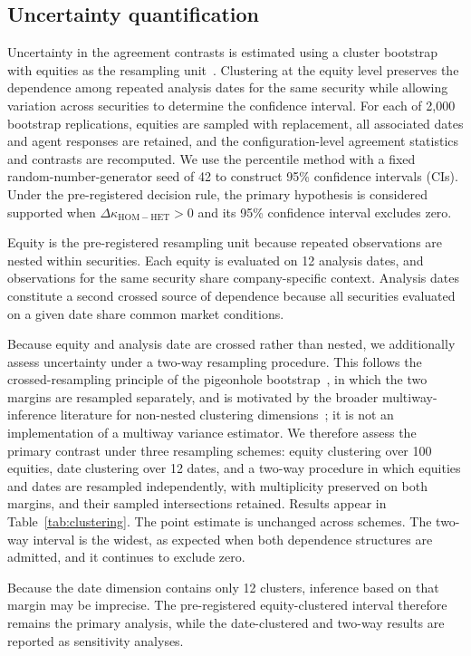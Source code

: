 \documentclass{ieeeaccess}
\begin{document}
\subsection{Uncertainty quantification}
\label{subsec:uncertainty}
Uncertainty in the agreement contrasts is estimated using a cluster bootstrap
with equities as the resampling unit~\cite{efron1993}. Clustering at the equity
level preserves the dependence among repeated analysis dates for the same
security while allowing variation across securities to determine the confidence
interval. For each of 2{,}000 bootstrap replications, equities are sampled with
replacement, all associated dates and agent responses are retained, and the
configuration-level agreement statistics and contrasts are recomputed. We use
the percentile method with a fixed random-number-generator seed of 42 to
construct 95\% confidence intervals (CIs). Under the pre-registered decision
rule, the
primary hypothesis is considered supported when
$\Delta\kappa_{\mathrm{HOM-HET}}>0$ and its 95\% confidence interval excludes
zero.

Equity is the pre-registered resampling unit because repeated observations are
nested within securities. Each equity is evaluated on 12 analysis dates, and
observations for the same security share company-specific context. Analysis dates
constitute a second crossed source of dependence because all securities evaluated
on a given date share common market conditions.

Because equity and analysis date are crossed rather than nested, we additionally
assess uncertainty under a two-way resampling procedure. This follows the
crossed-resampling principle of the pigeonhole
bootstrap~\cite{owen2007pigeonhole}, in which the two margins are resampled
separately, and is motivated by the broader multiway-inference literature for
non-nested clustering dimensions~\cite{cameron2011multiway}; it is not an
implementation of a multiway variance estimator. We therefore assess the primary
contrast under three resampling schemes: equity clustering over 100 equities,
date clustering over 12 dates, and a two-way procedure in which equities and
dates are resampled independently, with multiplicity preserved on both margins,
and their sampled intersections retained. Results appear in Table~\ref{tab:clustering}. The
point estimate is unchanged across schemes. The two-way interval is the widest, as
expected when both dependence structures are admitted, and it continues to exclude
zero.

Because the date dimension contains only 12 clusters, inference based on that
margin may be imprecise. The pre-registered equity-clustered interval therefore
remains the primary analysis, while the date-clustered and two-way results are
reported as sensitivity analyses.
\end{document}
